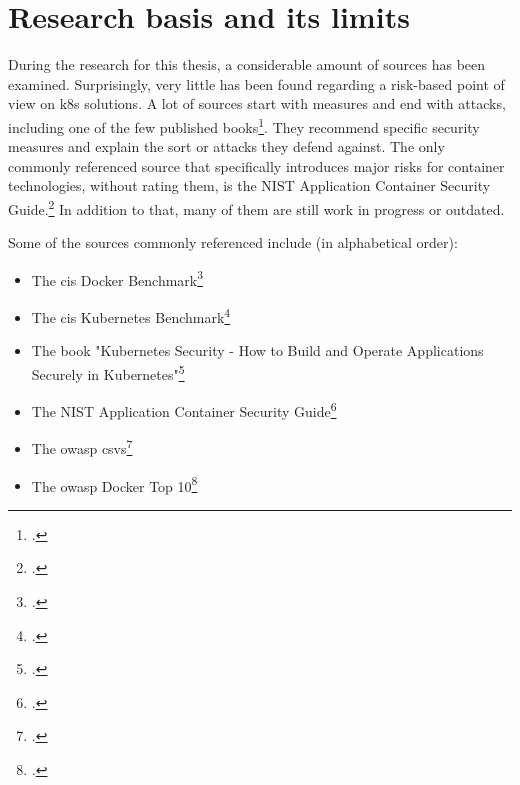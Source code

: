 \section{Research basis and its limits}

During the research for this thesis, a considerable amount of sources has been examined. Surprisingly, very little has been found regarding a risk-based point of view on \gls{k8s} solutions. A lot of sources start with measures and end with attacks, including one of the few published books\footcite{k8sBook}. They recommend specific security measures and explain the sort or attacks they defend against. The only commonly referenced source that specifically introduces major risks for container technologies, without rating them, is the NIST Application Container Security Guide.\footcite{nistK8s}
In addition to that, many of them are still work in progress or outdated.

Some of the sources commonly referenced include (in alphabetical order):
\begin{itemize}

\item The \gls{cis} Docker Benchmark\footcite{cisDocker}

\item The \gls{cis} Kubernetes Benchmark\footcite{cisK8s}

\item The book "Kubernetes Security - How to Build and Operate Applications Securely in Kubernetes"\footcite{k8sBook}

\item The NIST Application Container Security Guide\footcite{nistK8s}

\item The \gls{owasp} \gls{csvs}\footcite{csvsGithub}

\item The \gls{owasp} Docker Top 10\footcite{dockerTop10Github}

\end{itemize}


